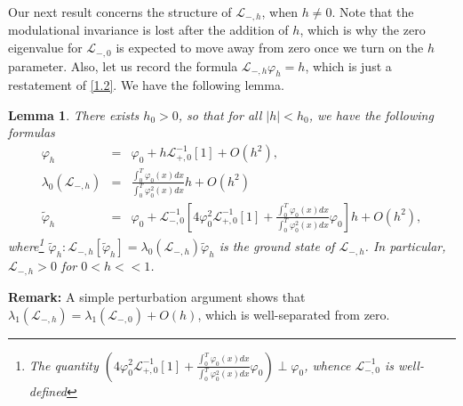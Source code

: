 \documentclass[12pt]{amsart}
\newtheorem{lemma}{Lemma}
\theoremstyle{definition}
\theoremstyle{remark}
\numberwithin{equation}{section}
\renewcommand{\(}{\left(}
\renewcommand{\)}{\right)}
\renewcommand{\[}{\left[}
\renewcommand{\]}{\right]}
\newcommand{\f}[2]{\frac{#1}{#2}}
\newcommand{\cl}{{\mathcal L}}
\newcommand{\la}{\lambda}
\newcommand{\vp}{\varphi}
\begin{document}
Our next result concerns the structure of $\cl_{-,h}$, when $h\neq 0$. Note that the modulational invariance is  lost after the addition of $h$, which is why the zero eigenvalue for $\cl_{-,0}$ is expected to move away from zero once we   turn on the $h$ parameter. Also, let us record the formula $\cl_{-,h} \vp_h=h$, which is just a restatement of \eqref{1.2}. We have the following lemma.
 \begin{lemma}
\label{le:10}
There exists $h_0>0$, so that for all $|h|<h_0$, we have the following formulas
\begin{eqnarray}
\label{25}
\vp_h &=& \vp_0 + h \cl_{+,0}^{-1}[1]+O(h^2),  \\
\label{27}
 \la_0(\cl_{-,h}) &=& \f{\int_{0}^{T} \vp_0(x)dx}{\int_{0}^{T} \vp_0^2 (x)dx} h+O(h^2)\\
 \label{28}
 \tilde{\vp}_h &=& \vp_0+  \cl_{-,0}^{-1}\left[4 \vp_0^2  \cl_{+,0}^{-1}[1] + \f{\int_{0}^{T} \vp_0(x)dx}{\int_{0}^{T} \vp_0^2 (x)dx}     \vp_0 \right] h +O(h^2),
\end{eqnarray}
where\footnote{The quantity $\left(4 \vp_0^2  \cl_{+,0}^{-1}[1] + \f{\int_{0}^{T} \vp_0(x)dx}{\int_{0}^{T} \vp_0^2 (x)dx}     \vp_0\right)  \perp \vp_0$, whence $\cl_{-,0}^{-1}$ is well-defined}  $\tilde{\vp}_h:  \cl_{-,h}[\tilde{\vp}_h]= \la_0(\cl_{-,h}) \tilde{\vp}_h$ is the  ground state of
$\cl_{-,h}$.
In particular, $\cl_{-,h}>0$ for $0<h<<1$.
\end{lemma}
 {\bf Remark:} A simple perturbation argument shows that $\la_1(\cl_{-,h})=\la_1(\cl_{-,0})+O(h)$, which is well-separated from zero.
\end{document}
